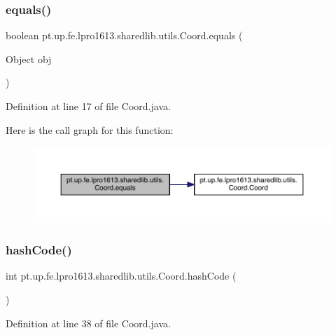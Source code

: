 \subsubsection{\texorpdfstring{equals()}{equals()}}
{\footnotesize\ttfamily boolean pt.\+up.\+fe.\+lpro1613.\+sharedlib.\+utils.\+Coord.\+equals (\begin{DoxyParamCaption}\item[{Object}]{obj }\end{DoxyParamCaption})}



Definition at line 17 of file Coord.\+java.

Here is the call graph for this function\+:
\nopagebreak
\begin{figure}[H]
\begin{center}
\leavevmode
\includegraphics[width=350pt]{classpt_1_1up_1_1fe_1_1lpro1613_1_1sharedlib_1_1utils_1_1_coord_ab7b6eb36dbf1fe7df81fb9cfedeed2eb_cgraph}
\end{center}
\end{figure}
\hypertarget{classpt_1_1up_1_1fe_1_1lpro1613_1_1sharedlib_1_1utils_1_1_coord_aba6a1e22404fa05826536d96a00bd5c4}{}\label{classpt_1_1up_1_1fe_1_1lpro1613_1_1sharedlib_1_1utils_1_1_coord_aba6a1e22404fa05826536d96a00bd5c4} 
\subsubsection{\texorpdfstring{hash\+Code()}{hashCode()}}
{\footnotesize\ttfamily int pt.\+up.\+fe.\+lpro1613.\+sharedlib.\+utils.\+Coord.\+hash\+Code (\begin{DoxyParamCaption}{ }\end{DoxyParamCaption})}



Definition at line 38 of file Coord.\+java.



